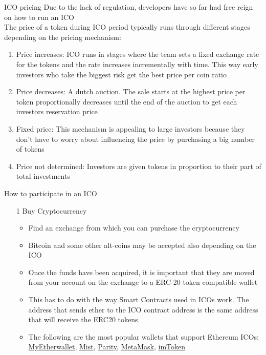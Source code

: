 \documentclass[9pt]{beamer}
\begin{document}
\begin{frame}{ICO pricing}
	Due to the lack of regulation, developers have so far had free reign on how to run an ICO \\ \vspace{3mm}
	The price of a token during ICO period typically runs through different stages depending on the pricing mechanism:
	\begin{small}
		\begin{enumerate}
			\item Price increases: ICO runs in stages where the team sets a fixed exchange rate for the tokens and the rate increases incrementally with time. This way early investors who take the biggest risk get the best price per coin ratio
			\item Price decreases: A dutch auction. The sale starts at the highest price per token proportionally decreases until the end of the auction to get each investors reservation price
			\item Fixed price: This mechanism is appealing to large investors because they don't have to worry about influencing the price by purchasing a big number of tokens
			\item Price not determined: Investors are given tokens in proportion to their part of total investments
		\end{enumerate}
	\end{small}
\end{frame}



\begin{frame}{How to participate in an ICO}
	\begin{enumerate}
		\item[1] Buy Cryptocurrency
		\begin{itemize}
			\item Find an exchange from which you can purchase the cryptocurrency
			\item Bitcoin and some other alt-coins may be accepted also depending on the ICO
			\item Once the funds have been acquired, it is important that they are moved from your account on the exchange to a ERC-20 token compatible wallet
			\item This has to do with the way Smart Contracts used in ICOs work. The address that sends ether to the ICO contract address is the same address that will receive the ERC20 tokens
			\item The following are the most popular wallets that support Ethereum ICOs: \href{https://www.myetherwallet.com/}{MyEtherwallet}, \href{https://github.com/ethereum/mist/releases}{Mist}, \href{https://ethcore.io/parity.html}{Parity}, \href{https://metamask.io/}{MetaMask}, \href{https://itunes.apple.com/us/app/imtoken/id1153230571?ls=1&mt=8}{imToken}
		\end{itemize}
	\end{enumerate}
\end{frame}
\end{document}
